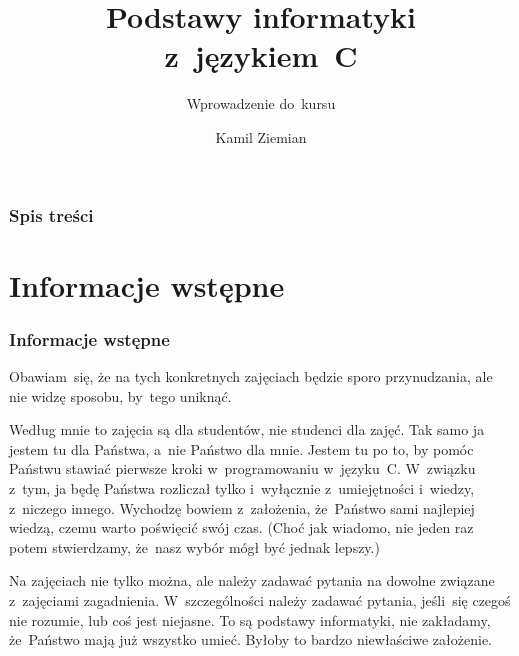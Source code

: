 \documentclass[10pt,t]{beamer}
\title{Podstawy informatyki z~językiem~C}
\subtitle{Wprowadzenie do~kursu}
\author{Kamil Ziemian}
\begin{document}





\RaggedRight





\maketitle





\begin{frame}
  \frametitle{Spis treści}


  \tableofcontents

\end{frame}





\section{Informacje wstępne}



\begin{frame}
  \frametitle{Informacje wstępne}


  Obawiam~się, że na tych konkretnych zajęciach będzie sporo przynudzania,
  ale nie widzę sposobu, by~tego uniknąć.

  Według mnie to zajęcia są dla studentów, nie studenci dla zajęć. Tak samo
  ja jestem tu dla Państwa, a~nie Państwo dla mnie. Jestem tu po to, by
  pomóc Państwu stawiać pierwsze kroki w~programowaniu w~języku~C.
  W~związku z~tym, ja będę Państwa rozliczał tylko i~wyłącznie
  z~umiejętności i~wiedzy, z~niczego innego. Wychodzę bowiem z~założenia,
  że~Państwo sami najlepiej wiedzą, czemu warto poświęcić swój czas. (Choć
  jak wiadomo, nie jeden raz potem stwierdzamy, że~nasz wybór mógł być
  jednak lepszy.)

  Na zajęciach nie tylko można, ale \alert{należy} zadawać pytania
  na dowolne związane z~zajęciami zagadnienia. W~szczególności
  \alert{należy} zadawać pytania, jeśli~się czegoś nie rozumie, lub coś
  jest niejasne. To są podstawy informatyki, \alert{nie} zakładamy,
  że~Państwo mają już wszystko umieć. Byłoby to bardzo niewłaściwe
  założenie.

\end{frame}
\end{document}
